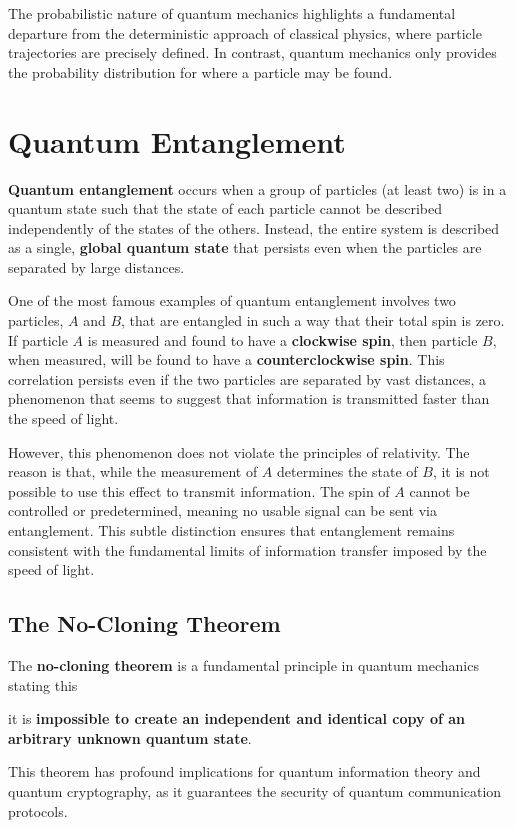 The probabilistic nature of quantum mechanics highlights a fundamental
departure from the deterministic approach of classical physics, where
particle trajectories are precisely defined. In contrast, quantum
mechanics only provides the probability distribution for where a
particle may be found.

\section{Quantum Entanglement}

\textbf{Quantum entanglement} occurs when a group of particles (at
least two) is in a quantum state such that the state of each particle
cannot be described independently of the states of the others.
Instead, the entire system is described as a single, \textbf{global
quantum state} that persists even when the particles are separated by
large distances.

One of the most famous examples of quantum entanglement involves two
particles, \(A\) and \(B\), that are entangled in such a way that
their total spin is zero. If particle \(A\) is measured and found to
have a \textbf{clockwise spin}, then particle \(B\), when measured,
will be found to have a \textbf{counterclockwise spin}. This
correlation persists even if the two particles are separated by vast
distances, a phenomenon that seems to suggest that information is
transmitted faster than the speed of light.

However, this phenomenon does not violate the principles of
relativity. The reason is that, while the measurement of \(A\)
determines the state of \(B\), it is not possible to use this effect
to transmit information. The spin of \(A\) cannot be controlled or
predetermined, meaning no usable signal can be sent via entanglement.
This subtle distinction ensures that entanglement remains consistent
with the fundamental limits of information transfer imposed by the
speed of light.

\subsection{The No-Cloning Theorem}

The \textbf{no-cloning theorem} is a fundamental principle in quantum
mechanics stating this 
\begin{boxH}
  it is \textbf{impossible to create an independent and identical copy
  of an arbitrary unknown quantum state}.
\end{boxH}
This theorem has profound implications for quantum information theory
and quantum cryptography, as it guarantees the security of quantum
communication protocols.

